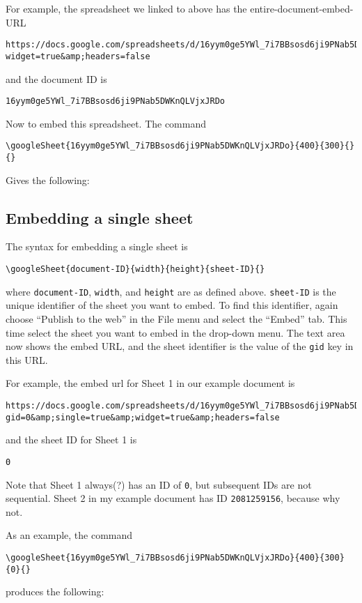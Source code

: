 \documentclass{ximera}
\begin{document}
For example, the spreadsheet we linked to above has the entire-document-embed-URL
\begin{verbatim}
https://docs.google.com/spreadsheets/d/16yym0ge5YWl_7i7BBsosd6ji9PNab5DWKnQLVjxJRDo/pubhtml?widget=true&amp;headers=false
\end{verbatim}
and the document ID is
\begin{verbatim}
16yym0ge5YWl_7i7BBsosd6ji9PNab5DWKnQLVjxJRDo
\end{verbatim}

Now to embed this spreadsheet. The command
\begin{verbatim}
\googleSheet{16yym0ge5YWl_7i7BBsosd6ji9PNab5DWKnQLVjxJRDo}{400}{300}{}{}
\end{verbatim}
Gives the following:



\subsection{Embedding a single sheet}

The syntax for embedding a single sheet is
\begin{verbatim}
\googleSheet{document-ID}{width}{height}{sheet-ID}{}
\end{verbatim}
where \texttt{document-ID}, \texttt{width}, and \texttt{height} are as defined above. \texttt{sheet-ID} is the unique identifier of the sheet you want to embed. To find this identifier, again choose ``Publish to the web'' in the File menu and select the ``Embed'' tab. This time select the sheet you want to embed in the drop-down menu. The text area now shows the embed URL, and the sheet identifier is the value of the \texttt{gid} key in this URL.

For example, the embed url for Sheet 1 in our example document is 
\begin{verbatim}
https://docs.google.com/spreadsheets/d/16yym0ge5YWl_7i7BBsosd6ji9PNab5DWKnQLVjxJRDo/pubhtml?gid=0&amp;single=true&amp;widget=true&amp;headers=false
\end{verbatim}
and the sheet ID for Sheet 1 is
\begin{verbatim}
0
\end{verbatim}
Note that Sheet 1 always(?) has an ID of \texttt{0}, but subsequent IDs are not sequential. Sheet 2 in my example document has ID \texttt{2081259156}, because why not.

As an example, the command
\begin{verbatim}
\googleSheet{16yym0ge5YWl_7i7BBsosd6ji9PNab5DWKnQLVjxJRDo}{400}{300}{0}{}
\end{verbatim}
produces the following:
\end{document}
